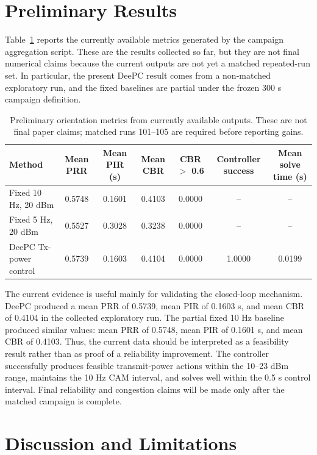 \documentclass[conference]{IEEEtran}
\begin{document}
\section{Preliminary Results}

Table~\ref{tab:preliminary} reports the currently available metrics generated by the campaign aggregation script. These are the results collected so far, but they are not final numerical claims because the current outputs are not yet a matched repeated-run set. In particular, the present DeePC result comes from a non-matched exploratory run, and the fixed baselines are partial under the frozen 300 s campaign definition.

\begin{table}[t]
\centering
\caption{Preliminary orientation metrics from currently available outputs. These are not final paper claims; matched runs 101--105 are required before reporting gains.}
\label{tab:preliminary}
\begin{tabular}{lcccccc}
\toprule
Method & Mean PRR & Mean PIR (s) & Mean CBR & CBR $>$ 0.6 & Controller success & Mean solve time (s)\\
\midrule
Fixed 10 Hz, 20 dBm & 0.5748 & 0.1601 & 0.4103 & 0.0000 & -- & --\\
Fixed 5 Hz, 20 dBm & 0.5527 & 0.3028 & 0.3238 & 0.0000 & -- & --\\
DeePC Tx-power control & 0.5739 & 0.1603 & 0.4104 & 0.0000 & 1.0000 & 0.0199\\
\bottomrule
\end{tabular}
\end{table}

The current evidence is useful mainly for validating the closed-loop mechanism. DeePC produced a mean PRR of 0.5739, mean PIR of 0.1603 s, and mean CBR of 0.4104 in the collected exploratory run. The partial fixed 10 Hz baseline produced similar values: mean PRR of 0.5748, mean PIR of 0.1601 s, and mean CBR of 0.4103. Thus, the current data should be interpreted as a feasibility result rather than as proof of a reliability improvement. The controller successfully produces feasible transmit-power actions within the 10--23 dBm range, maintains the 10 Hz CAM interval, and solves well within the 0.5 s control interval. Final reliability and congestion claims will be made only after the matched campaign is complete.

\section{Discussion and Limitations}
\end{document}
